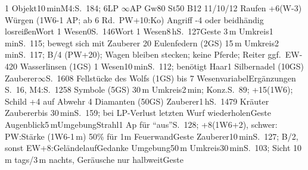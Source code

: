 \documentclass{m5figur-mv}[2014/01/16]
\begin{document}
{{%



} %

%
  {1 Objekt}{10\,min}{M4:S.~184; 6LP $\infty$AP Gw80 St50 B12 11/10/12
  Raufen +6(W-3) Würgen (1W6-1 AP; ab 6 Rd.\ PW+10:Ko)
  Angriff -4 oder beidhändig losreißen}{Wort}
%
  {1 Wesen}{0}{S.~146}{Wort}
%
  {1 Wesen}{8\,h}{S.~127}{Geste}
%
  {3\,m Umkreis}{1\,min}{S.~115; bewegt sich mit Zauberer}%
  {20 Eulenfedern (2GS)}
%
  {15\,m Umkreis}{2\,min}{S.~117; B/4 (PW+20); Wagen bleiben stecken;
  keine Pferde; Reiter ggf.\ EW-4}{20 Wasserlinsen (1GS)}
%
  {1 Wesen}{10\,min}{S.~112; benötigt Haar}{1 Silbernadel (10GS)}
%
  {Zauberer}{$\infty$}{S.~160}{8 Fellstücke des Wolfs (1GS)}
%
  {bis 7 Wesen}{variabel}{Ergänzungen S.~16, M4:S.~125}{8 Symbole (5GS)}
%
  {30\,m Umkreis}{2\,min; Konz.}{S.~89; +15(1W6); Schild +4 auf Abwehr}%
  {4 Diamanten (50GS)}
%
  {Zauberer}{1\,h}{S.~147}{9 Kräuter}
%
  {Zauberer}{bis 30\,min}{S.~159;
  bei LP-Verlust letzten Wurf wiederholen}{Geste}
%
  {Augenblick}{5\,m}{Umgebung}{Strahl}{1 Ap für "`aus"'}{S.~128;
  +8(1W6+2), schwer: PW:Stärke (1W6-1\,m) 50\% für 1m Feuerwand}{Geste}
%
  {Zauberer}{10\,min}{S.~127; B/2, sonst EW+8:Geländelauf}{Gedanke}
%
  {Umgebung}{50\,m Umkreis}{30\,min}{S.~103; Sicht 10\,m tags/3\,m nachts,
  Geräusche nur halbweit}{Geste}



}%

\end{document}
